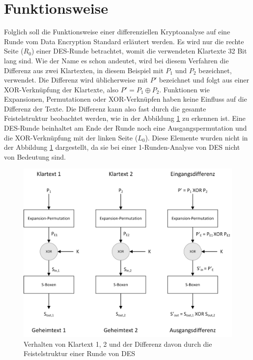 \clearpage
\section{Funktionsweise}\label{sec:Funktionsweise}
Folglich soll die Funktionsweise einer differenziellen Kryptoanalyse auf eine Runde vom Data Encryption Standard erläutert werden. Es wird nur die rechte Seite ($R_{0}$) einer DES-Runde betrachtet, womit die verwendeten Klartexte 32 Bit lang sind. 
Wie der Name es schon andeutet, wird bei diesem Verfahren die Differenz aus zwei Klartexten, in diesem Beispiel mit $P_{1}$ und $P_{2}$ bezeichnet, verwendet. Die Differenz wird üblicherweise mit $P'$ bezeichnet und folgt aus einer XOR-Verknüpfung der Klartexte, also $P' = P_{1} \oplus P_{2}$.
Funktionen wie Expansionen, Permutationen oder XOR-Verknüpfen haben keine Einfluss auf die Differenz der Texte. Die Differenz kann also fast durch die gesamte Feistelstruktur beobachtet werden, wie in der Abbildung \ref{fig:DES_Differenz} zu erkennen ist. 
Eine DES-Runde beinhaltet am Ende der Runde noch eine Ausgangspermutation und die XOR-Verknüpfung mit der linken Seite ($L_{0}$). Diese Elemente wurden nicht in der Abbildung \ref{fig:DES_Differenz} dargestellt, da sie bei einer 1-Runden-Analyse von DES nicht von Bedeutung sind.

\begin{figure}[h]
	\centering
	\includegraphics[width=1.0\linewidth]{graphics/DES_Differenz.jpg}
	\caption{Verhalten von Klartext 1, 2 und der Differenz davon durch die Feistelstruktur einer Runde von DES \cite{the_morpheus_tutoials_kryptographie_2016}}
	\label{fig:DES_Differenz}
\end{figure}

